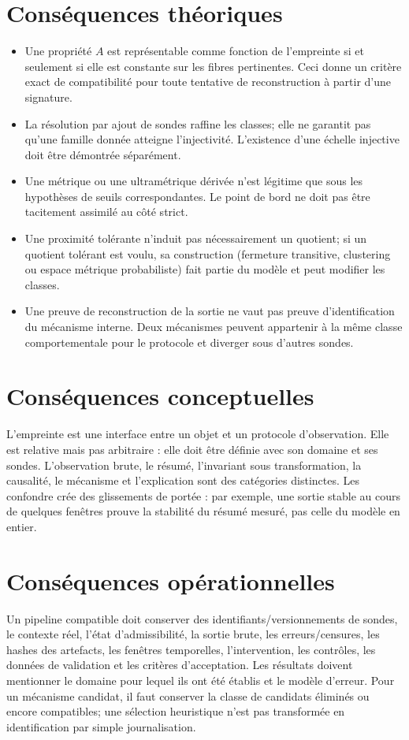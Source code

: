 \documentclass[11pt,a4paper,oneside]{report}
\begin{document}
\section{Conséquences théoriques}
\begin{itemize}
\item Une propriété \(A\) est représentable comme fonction de l'empreinte si et seulement si elle est constante sur les fibres pertinentes. Ceci donne un critère exact de compatibilité pour toute tentative de reconstruction à partir d'une signature.
\item La résolution par ajout de sondes raffine les classes; elle ne garantit pas qu'une famille donnée atteigne l'injectivité. L'existence d'une échelle injective doit être démontrée séparément.
\item Une métrique ou une ultramétrique dérivée n'est légitime que sous les hypothèses de seuils correspondantes. Le point de bord ne doit pas être tacitement assimilé au côté strict.
\item Une proximité tolérante n'induit pas nécessairement un quotient; si un quotient tolérant est voulu, sa construction (fermeture transitive, clustering ou espace métrique probabiliste) fait partie du modèle et peut modifier les classes.
\item Une preuve de reconstruction de la sortie ne vaut pas preuve d'identification du mécanisme interne. Deux mécanismes peuvent appartenir à la même classe comportementale pour le protocole et diverger sous d'autres sondes.
\end{itemize}

\section{Conséquences conceptuelles}
L'empreinte est une interface entre un objet et un protocole d'observation. Elle est relative mais pas arbitraire : elle doit être définie avec son domaine et ses sondes. L'observation brute, le résumé, l'invariant sous transformation, la causalité, le mécanisme et l'explication sont des catégories distinctes. Les confondre crée des glissements de portée : par exemple, une sortie stable au cours de quelques fenêtres prouve la stabilité du résumé mesuré, pas celle du modèle en entier.

\section{Conséquences opérationnelles}
Un pipeline compatible doit conserver des identifiants/versionnements de sondes, le contexte réel, l'état d'admissibilité, la sortie brute, les erreurs/censures, les hashes des artefacts, les fenêtres temporelles, l'intervention, les contrôles, les données de validation et les critères d'acceptation. Les résultats doivent mentionner le domaine pour lequel ils ont été établis et le modèle d'erreur. Pour un mécanisme candidat, il faut conserver la classe de candidats éliminés ou encore compatibles; une sélection heuristique n'est pas transformée en identification par simple journalisation.
\end{document}
